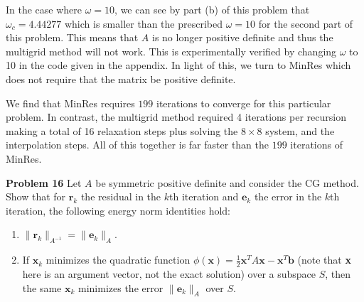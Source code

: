 \documentclass[12pt]{article}
\newcommand{\problem}[1]{\hspace{-4 ex} \large \textbf{Problem #1} }
\begin{document}
In the case where $\omega = 10$, we can see by part (b) of this problem that $\omega_c = 4.44277$ which is smaller than the prescribed $\omega=10$ for the second part of this problem. This means that $A$ is no longer positive definite and thus the multigrid method will not work. This is experimentally verified by changing $\omega$ to 10 in the code given in the appendix. In light of this, we turn to MinRes which does not require that the matrix be positive definite. 
\bigbreak

We find that MinRes requires $199$ iterations to converge for this particular problem. In contrast, the multigrid method required 4 iterations per recursion making a total of 16 relaxation steps plus solving the $8 \times 8$ system, and the interpolation steps. All of this together is far faster than the $199$ iterations of MinRes. 


\bigbreak

\problem{16} Let $ A $ be symmetric positive definite and consider the CG method. Show that for $ \textbf{r}_k $ the residual in the $ k $th iteration and $ \textbf{e}_k $ the error in the $ k $th iteration, the following energy norm identities hold:
\begin{enumerate}[leftmargin=0.6cm,label=(\alph*)]
	\item $ \lVert \textbf{r}_k \rVert_{A^{-1}} = \lVert \textbf{e}_k \rVert_{A}$.
	\item If $ \textbf{x}_k $ minimizes the quadratic function $ \phi(\textbf{x}) = \frac{1}{2}\textbf{x}^TA\textbf{x} - \textbf{x}^T\textbf{b} $ (note that \textbf{x} here is an argument vector, not the exact solution) over a subspace $ S $, then the same $ \textbf{x}_k $ minimizes the error $ \lVert \textbf{e}_k \rVert_{A} $ over $ S $.
\end{enumerate}
\end{document}
